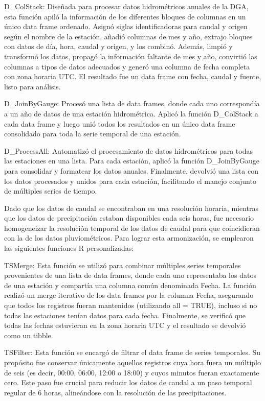 \documentclass[hess, manuscript]{copernicus}
\begin{document}
D_ColStack: Diseñada para procesar datos hidrométricos anuales de la DGA, esta función apiló la información de los diferentes bloques de columnas en un único data frame ordenado. Asignó siglas identificadoras para caudal y origen según el nombre de la estación, añadió columnas de mes y año, extrajo bloques con datos de día, hora, caudal y origen, y los combinó. Además, limpió y transformó los datos, propagó la información faltante de mes y año, convirtió las columnas a tipos de datos adecuados y generó una columna de fecha completa con zona horaria UTC. El resultado fue un data frame con fecha, caudal y fuente, listo para análisis.

D_JoinByGauge: Procesó una lista de data frames, donde cada uno correspondía a un año de datos de una estación hidrométrica. Aplicó la función D_ColStack a cada data frame y luego unió todos los resultados en un único data frame consolidado para toda la serie temporal de una estación.

D_ProcessAll: Automatizó el procesamiento de datos hidrométricos para todas las estaciones en una lista. Para cada estación, aplicó la función D_JoinByGauge para consolidar y formatear los datos anuales. Finalmente, devolvió una lista con los datos procesados y unidos para cada estación, facilitando el manejo conjunto de múltiples series de tiempo.

Dado que los datos de caudal se encontraban en una resolución horaria, mientras que los datos de precipitación estaban disponibles cada seis horas, fue necesario homogeneizar la resolución temporal de los datos de caudal para que coincidieran con la de los datos pluviométricos. Para lograr esta armonización, se emplearon las siguientes funciones R personalizadas:

TSMerge: Esta función se utilizó para combinar múltiples series temporales provenientes de una lista de data frames, donde cada uno representaba los datos de una estación y compartía una columna común denominada Fecha. La función realizó un merge iterativo de los data frames por la columna Fecha, asegurando que todos los registros fueran mantenidos (utilizando all = TRUE), incluso si no todas las estaciones tenían datos para cada fecha. Finalmente, se verificó que todas las fechas estuvieran en la zona horaria UTC y el resultado se devolvió como un tibble.

TSFilter: Esta función se encargó de filtrar el data frame de series temporales. Su propósito fue conservar únicamente aquellos registros cuya hora fuera un múltiplo de seis (es decir, 00:00, 06:00, 12:00 o 18:00) y cuyos minutos fueran exactamente cero. Este paso fue crucial para reducir los datos de caudal a un paso temporal regular de 6 horas, alineándose con la resolución de las precipitaciones.
\end{document}
